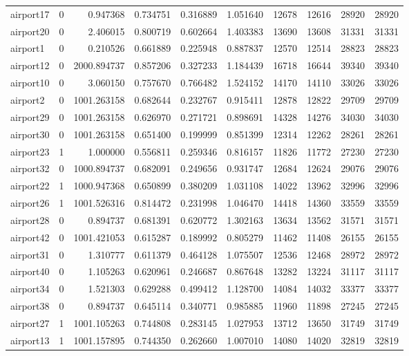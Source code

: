 \begin{longtable}{|l|r|r|r|r|r|r|r|r|r|}
airport17 & 0 & 0.947368 & 0.734751 & 0.316889 & 1.051640 & 12678 & 12616 & 28920 & 28920 \\
airport20 & 0 & 2.406015 & 0.800719 & 0.602664 & 1.403383 & 13690 & 13608 & 31331 & 31331 \\
airport1 & 0 & 0.210526 & 0.661889 & 0.225948 & 0.887837 & 12570 & 12514 & 28823 & 28823 \\
airport12 & 0 & 2000.894737 & 0.857206 & 0.327233 & 1.184439 & 16718 & 16644 & 39340 & 39340 \\
airport10 & 0 & 3.060150 & 0.757670 & 0.766482 & 1.524152 & 14170 & 14110 & 33026 & 33026 \\
airport2 & 0 & 1001.263158 & 0.682644 & 0.232767 & 0.915411 & 12878 & 12822 & 29709 & 29709 \\
airport29 & 0 & 1001.263158 & 0.626970 & 0.271721 & 0.898691 & 14328 & 14276 & 34030 & 34030 \\
airport30 & 0 & 1001.263158 & 0.651400 & 0.199999 & 0.851399 & 12314 & 12262 & 28261 & 28261 \\
airport23 & 1 & 1.000000 & 0.556811 & 0.259346 & 0.816157 & 11826 & 11772 & 27230 & 27230 \\
airport32 & 0 & 1000.894737 & 0.682091 & 0.249656 & 0.931747 & 12684 & 12624 & 29076 & 29076 \\
airport22 & 1 & 1000.947368 & 0.650899 & 0.380209 & 1.031108 & 14022 & 13962 & 32996 & 32996 \\
airport26 & 1 & 1001.526316 & 0.814472 & 0.231998 & 1.046470 & 14418 & 14360 & 33559 & 33559 \\
airport28 & 0 & 0.894737 & 0.681391 & 0.620772 & 1.302163 & 13634 & 13562 & 31571 & 31571 \\
airport42 & 0 & 1001.421053 & 0.615287 & 0.189992 & 0.805279 & 11462 & 11408 & 26155 & 26155 \\
airport31 & 0 & 1.310777 & 0.611379 & 0.464128 & 1.075507 & 12536 & 12468 & 28972 & 28972 \\
airport40 & 0 & 1.105263 & 0.620961 & 0.246687 & 0.867648 & 13282 & 13224 & 31117 & 31117 \\
airport34 & 0 & 1.521303 & 0.629288 & 0.499412 & 1.128700 & 14084 & 14032 & 33377 & 33377 \\
airport38 & 0 & 0.894737 & 0.645114 & 0.340771 & 0.985885 & 11960 & 11898 & 27245 & 27245 \\
airport27 & 1 & 1001.105263 & 0.744808 & 0.283145 & 1.027953 & 13712 & 13650 & 31749 & 31749 \\
airport13 & 1 & 1001.157895 & 0.744350 & 0.262660 & 1.007010 & 14080 & 14020 & 32819 & 32819 \\

\end{longtable}
